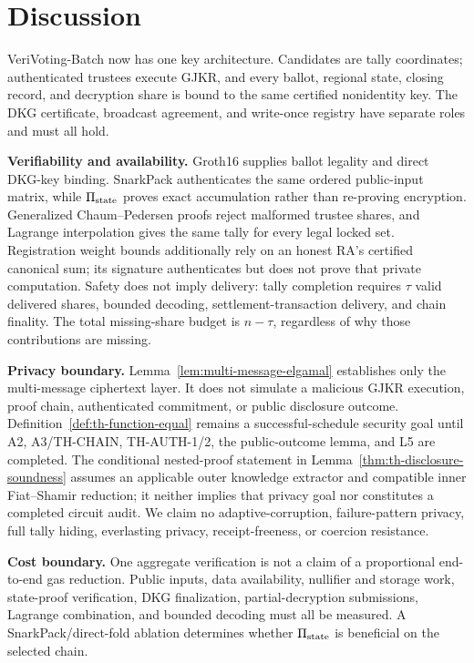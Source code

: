 \documentclass[pdflatex,sn-mathphys-num]{sn-jnl}%
\theoremstyle{thmstyleone}%
\theoremstyle{thmstyletwo}%
\theoremstyle{thmstylethree}%
\begin{document}
\section{Discussion}\label{sec6}

VeriVoting-Batch now has one key architecture.  Candidates are tally
coordinates; authenticated trustees execute GJKR, and every ballot, regional
state, closing record, and decryption share is bound to the same certified
nonidentity key.  The DKG certificate, broadcast agreement, and write-once
registry have separate roles and must all hold.

\textbf{Verifiability and availability.} Groth16 supplies ballot legality and
direct DKG-key binding.  SnarkPack authenticates the same ordered public-input
matrix, while $\Pi_{\rm state}$ proves exact accumulation rather than
re-proving encryption.  Generalized Chaum--Pedersen proofs reject malformed
trustee shares, and Lagrange interpolation gives the same tally for every legal
locked set.  Registration weight bounds additionally rely on an honest RA's
certified canonical sum; its signature authenticates but does not prove that
private computation.  Safety does not imply delivery: tally completion
requires $\tau$ valid delivered shares, bounded decoding,
settlement-transaction delivery, and chain finality.  The total missing-share
budget is $n-\tau$, regardless of why those contributions are missing.

\textbf{Privacy boundary.} Lemma~\ref{lem:multi-message-elgamal} establishes
only the multi-message ciphertext layer.  It does not simulate a malicious
GJKR execution, proof chain, authenticated commitment, or public disclosure
outcome.  Definition~\ref{def:th-function-equal} remains a successful-schedule
security goal until A2, A3/TH-CHAIN, TH-AUTH-1/2, the public-outcome lemma, and
L5 are completed.  The conditional nested-proof statement in
Lemma~\ref{thm:th-disclosure-soundness} assumes an applicable outer knowledge
extractor and compatible inner Fiat--Shamir reduction; it neither implies that
privacy goal nor constitutes a completed circuit audit.  We claim no adaptive-corruption,
failure-pattern privacy, full tally hiding, everlasting privacy,
receipt-freeness, or coercion resistance.

\textbf{Cost boundary.} One aggregate verification is not a claim of a
proportional end-to-end gas reduction.  Public inputs, data availability,
nullifier and storage work, state-proof verification, DKG finalization,
partial-decryption submissions, Lagrange combination, and bounded decoding
must all be measured.  A SnarkPack/direct-fold ablation determines whether
$\Pi_{\rm state}$ is beneficial on the selected chain.
\end{document}
